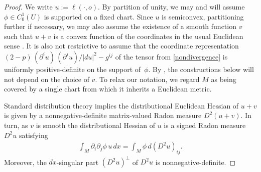 \documentclass[12pt]{amsart}
\newcommand{\p}{{\partial}}
\begin{document}
\begin{proof} We write $u := \ell(\cdot,o)$. By partition of unity, we may and will assume $\phi \in C^1_0(U)$ is supported on a fixed chart. Since $u$ is semiconvex, 
partitioning further if necessary, we may also assume the existence of a smooth function $v$ such that $u+v$ is a convex function of the coordinates in the usual Euclidean sense \cite[Satz 2.3]{Bangert79} . It is also not restrictive to assume that the coordinate representation $(2-p)\,(\p^i u)\,(\p^j u)/\vert du\vert^2 - g^{ij}$ of the tensor from \eqref{nondivergence} is uniformly 
positive-definite on  the support of~$\phi$. By \cite[p.\ 312]{Bangert79}, the constructions below will not depend on the choice of $v$. To relax our notation, we regard $M$ as being covered by a single chart from which it inherits a Euclidean metric.

Standard distribution theory implies the distributional Euclidean Hessian of $u+v$ is given by a 
nonnegative-definite matrix-valued Radon measure $D^2(u+v)$. In turn, as $v$ is smooth the distributional Hessian of $u$ is a signed Radon measure $D^2u$ satisfying
\begin{align*}
    \int_M \partial_i\partial_j\phi\,u\, d x = \int_M \phi\,d(D^2u)_{ij}.
\end{align*}
Moreover, the $dx$-singular part $(D^2 u)^{\perp}$ of $D^2u$ is nonnegative-definite.


\end{proof}
\end{document}
